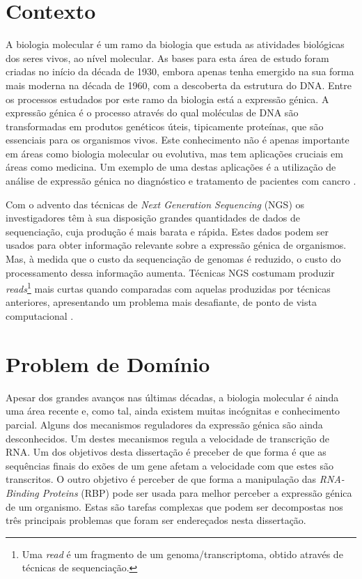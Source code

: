 \documentclass[9pt,a4paper]{extarticle}
\begin{document}
\begin{multicols}{2}

\section{Contexto} \label{sec:context}

A biologia molecular é um ramo da biologia que estuda as atividades biológicas
dos seres vivos, ao nível molecular. As bases para esta área de estudo foram
criadas no início da década de 1930, embora apenas tenha emergido na sua forma
mais moderna na década de 1960, com a descoberta da estrutura do DNA. Entre os
processos estudados por este ramo da biologia está a expressão génica. A
expressão génica é o processo através do qual moléculas de DNA são
transformadas em produtos genéticos úteis, tipicamente proteínas, que são
essenciais para os organismos vivos. Este conhecimento não é apenas importante
em áreas como biologia molecular ou evolutiva, mas tem aplicações cruciais em
áreas como medicina. Um exemplo de uma destas aplicações é a utilização de
análise de expressão génica no diagnóstico e tratamento de pacientes com cancro
\cite{Pusztai01062003}.

Com o advento das técnicas de \textit{Next Generation Sequencing} (NGS) os
investigadores têm à sua disposição grandes quantidades de dados de
sequenciação, cuja produção é mais barata e rápida. Estes dados podem ser usados
para obter informação relevante sobre a expressão génica de organismos. Mas, à
medida que o custo da sequenciação de genomas é reduzido, o custo do
processamento dessa informação aumenta. Técnicas NGS costumam produzir
\emph{reads}\footnote{Uma \emph{read} é um fragmento de um genoma/transcriptoma,
obtido através de técnicas de sequenciação.} mais curtas quando comparadas com
aquelas produzidas por técnicas anteriores, apresentando um problema mais
desafiante, de ponto de vista computacional \cite{Wolf2013}.

\section{Problem de Domínio} \label{sec:problem}

Apesar dos grandes avanços nas últimas décadas, a biologia molecular é ainda uma
área recente e, como tal, ainda existem muitas incógnitas e conhecimento
parcial. Alguns dos mecanismos reguladores da expressão génica são ainda
desconhecidos. Um destes mecanismos regula a velocidade de transcrição de RNA.
Um dos objetivos desta dissertação é preceber de que forma é que as sequências
finais do exões de um gene afetam a velocidade com que estes são transcritos. O
outro objetivo é perceber de que forma a manipulação das \emph{RNA-Binding
Proteins} (RBP) pode ser usada para melhor perceber a expressão génica de um
organismo. Estas são tarefas complexas que podem ser decompostas nos três
principais problemas que foram ser endereçados nesta dissertação.


\end{multicols}
\end{document}
